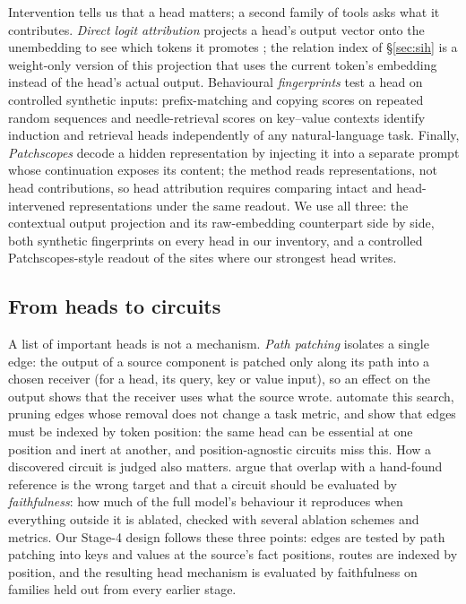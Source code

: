 Intervention tells us that a head matters; a second family of tools asks what it
contributes. \emph{Direct logit attribution} projects a head's output vector onto the
unembedding to see which tokens it promotes \citep{elhage2021mathematical,wang2023ioi};
the relation index of \S\ref{sec:sih} is a weight-only version of this projection that
uses the current token's embedding instead of the head's actual output. Behavioural
\emph{fingerprints} test a head on controlled synthetic inputs: prefix-matching and
copying scores on repeated random sequences \citep{olsson2022induction} and
needle-retrieval scores on key--value contexts \citep{wu2024retrieval} identify
induction and retrieval heads independently of any natural-language task. Finally,
\emph{Patchscopes} \citep{ghandeharioun2024patchscopes} decode a hidden
representation by injecting it into a separate prompt whose continuation exposes its
content; the method reads representations, not head contributions, so head
attribution requires comparing intact and head-intervened representations under the
same readout. We use all three: the contextual output projection and its
raw-embedding counterpart side by side, both synthetic fingerprints on every head in
our inventory, and a controlled Patchscopes-style readout of the sites where our
strongest head writes.

\subsection{From heads to circuits}
\label{sec:rw-circuits}

A list of important heads is not a mechanism. \emph{Path patching}
\citep{wang2023ioi} isolates a single edge: the output of a source component is
patched only along its path into a chosen receiver (for a head, its query, key or
value input), so an effect on the output shows that the receiver uses what the source
wrote. \citet{conmy2023acdc} automate this search, pruning edges whose removal does
not change a task metric, and \citet{haklay2025position} show that edges must be
indexed by token position: the same head can be essential at one position and inert
at another, and position-agnostic circuits miss this. How a discovered circuit is
judged also matters. \citet{hanna2024faithfulness} argue that overlap with a
hand-found reference is the wrong target and that a circuit should be evaluated by
\emph{faithfulness}: how much of the full model's behaviour it reproduces when
everything outside it is ablated, checked with several ablation schemes and metrics.
Our Stage-4 design follows these three points: edges are tested by path patching
into keys and values at the source's fact positions, routes are indexed by position,
and the resulting head mechanism is evaluated by faithfulness on families held out
from every earlier stage.

